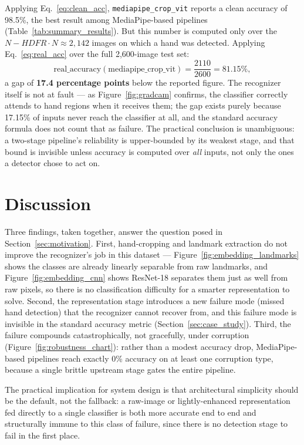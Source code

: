 \documentclass[11pt,a4paper]{article}
\newcommand{\codepath}[1]{\texttt{\small #1}}
\begin{document}
Applying Eq.~\eqref{eq:clean_acc}, \codepath{mediapipe\_crop\_vit} reports a
clean accuracy of 98.5\%, the best result among MediaPipe-based pipelines
(Table~\ref{tab:summary_results}). But this number is computed only over the
$N - HDFR\cdot N \approx 2{,}142$ images on which a hand was detected.
Applying Eq.~\eqref{eq:real_acc} over the full 2{,}600-image test set:
\begin{equation}
  \text{real\_accuracy}(\text{mediapipe\_crop\_vit}) =
  \frac{2110}{2600} = 81.15\%,
\end{equation}
a gap of \textbf{17.4 percentage points} below the reported figure. The
recognizer itself is not at fault --- as Figure~\ref{fig:gradcam} confirms,
the classifier correctly attends to hand regions when it receives them; the
gap exists purely because 17.15\% of inputs never reach the classifier at
all, and the standard accuracy formula does not count that as failure. The
practical conclusion is unambiguous: a two-stage pipeline's reliability is
upper-bounded by its weakest stage, and that bound is invisible unless
accuracy is computed over \emph{all} inputs, not only the ones a detector
chose to act on.

\section{Discussion}

Three findings, taken together, answer the question posed in
Section~\ref{sec:motivation}. First, hand-cropping and landmark extraction do
not improve the recognizer's job in this dataset --- Figure~\ref{fig:embedding_landmarks}
shows the classes are already linearly separable from raw landmarks, and
Figure~\ref{fig:embedding_cnn} shows ResNet-18 separates them just as well
from raw pixels, so there is no classification difficulty for a smarter
representation to solve. Second, the representation stage introduces a new
failure mode (missed hand detection) that the recognizer cannot recover from,
and this failure mode is invisible in the standard accuracy metric
(Section~\ref{sec:case_study}). Third, the failure compounds catastrophically,
not gracefully, under corruption (Figure~\ref{fig:robustness_chart}): rather
than a modest accuracy drop, MediaPipe-based pipelines reach exactly 0\%
accuracy on at least one corruption type, because a single brittle upstream
stage gates the entire pipeline.

The practical implication for system design is that architectural simplicity
should be the default, not the fallback: a raw-image or lightly-enhanced
representation fed directly to a single classifier is both more accurate end
to end and structurally immune to this class of failure, since there is no
detection stage to fail in the first place.
\end{document}
